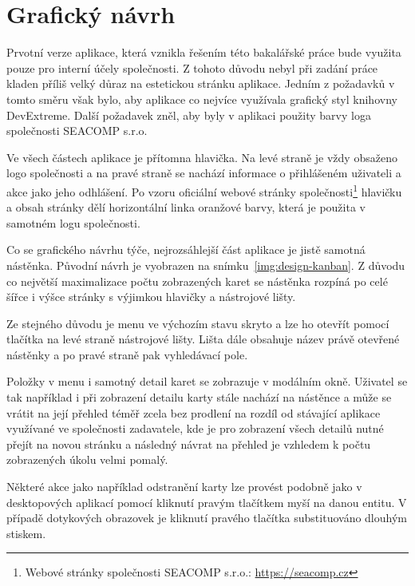 \section{Grafický návrh}
Prvotní verze aplikace, která vznikla řešením této bakalářské práce bude využita pouze pro interní účely společnosti. Z tohoto důvodu nebyl při zadání práce kladen příliš velký důraz na estetickou stránku aplikace. Jedním z požadavků v tomto směru však bylo, aby aplikace co nejvíce využívala grafický styl knihovny DevExtreme. Další požadavek zněl, aby byly v aplikaci použity barvy loga společnosti SEACOMP s.r.o.

Ve všech částech aplikace je přítomna hlavička. Na levé straně je vždy obsaženo logo společnosti a na pravé straně se nachází informace o přihlášeném uživateli a akce jako jeho odhlášení. Po vzoru oficiální webové stránky společnosti\footnote{Webové stránky společnosti SEACOMP s.r.o.: \url{https://seacomp.cz}} hlavičku a obsah stránky dělí horizontální linka oranžové barvy, která je použita v samotném logu společnosti.

Co se grafického návrhu týče, nejrozsáhlejší část aplikace je jistě samotná nástěnka. Původní návrh je vyobrazen na snímku~\ref{img:design-kanban}. Z důvodu co největší maximalizace počtu zobrazených karet se nástěnka rozpíná po celé šířce i výšce stránky s výjimkou hlavičky a nástrojové lišty.

Ze stejného důvodu je menu ve výchozím stavu skryto a lze ho otevřít pomocí tlačítka na levé straně nástrojové lišty. Lišta dále obsahuje název právě otevřené nástěnky a po pravé straně pak vyhledávací pole.

Položky v menu i samotný detail karet se zobrazuje v modálním okně. Uživatel se tak například i při zobrazení detailu karty stále nachází na nástěnce a může se vrátit na její přehled téměř zcela bez prodlení na rozdíl od stávající aplikace využívané ve společnosti zadavatele, kde je pro zobrazení všech detailů nutné přejít na novou stránku a následný návrat na přehled je vzhledem k počtu zobrazených úkolu velmi pomalý.

Některé akce jako například odstranění karty lze provést podobně jako v desktopových aplikací pomocí kliknutí pravým tlačítkem myší na danou entitu. V případě dotykových obrazovek je kliknutí pravého tlačítka substituováno dlouhým stiskem. 

